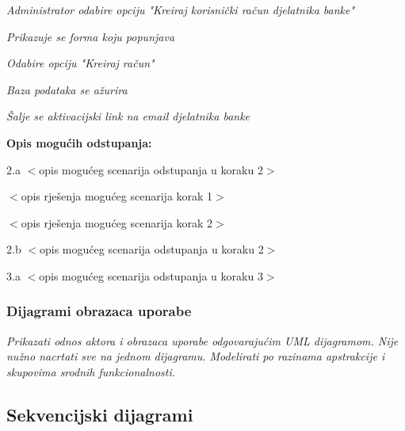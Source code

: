 \documentclass[11pt]{book}
\begin{document}
\begin{packed_item}
\begin{packed_item}
\begin{packed_item}
\begin{packed_item}
	\item[] \begin{packed_enum}
		
		\item \textit{Administrator odabire opciju "Kreiraj korisnički račun djelatnika banke"}\eject
		\item \textit{Prikazuje se forma koju popunjava}\eject 
		\item \textit{Odabire opciju "Kreiraj račun"}\eject 
		\item \textit{Baza podataka se ažurira}\eject
		\item \textit{Šalje se aktivacijski link na email djelatnika banke}\eject
	\end{packed_enum}
	
	\item  \textbf{Opis mogućih odstupanja:}
	
	\item[] \begin{packed_item}
		
		\item[2.a] $<$opis mogućeg scenarija odstupanja u koraku 2$>$
		\item[] \begin{packed_enum}
			
			\item $<$opis rješenja mogućeg scenarija korak 1$>$
			\item $<$opis rješenja mogućeg scenarija korak 2$>$
			
		\end{packed_enum}
		\item[2.b] $<$opis mogućeg scenarija odstupanja u koraku 2$>$
		\item[3.a] $<$opis mogućeg scenarija odstupanja  u koraku 3$>$
		
	\end{packed_item}
\end{packed_item}



\subsubsection{Dijagrami obrazaca uporabe}

\textit{Prikazati odnos aktora i obrazaca uporabe odgovarajućim UML dijagramom. Nije nužno nacrtati sve na jednom dijagramu. Modelirati po razinama apstrakcije i skupovima srodnih funkcionalnosti.}
\eject		

\subsection{Sekvencijski dijagrami}


\end{packed_item}
\end{packed_item}
\end{packed_item}
\end{document}
